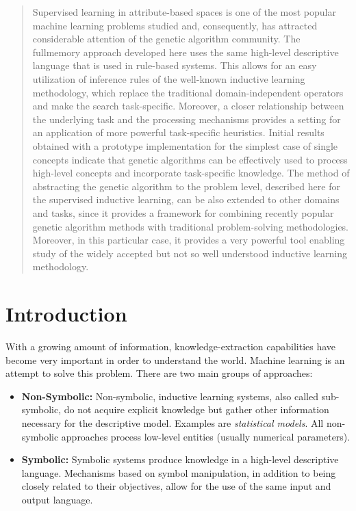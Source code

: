 \documentclass[../main.tex]{subfiles}
\begin{document}
\begin{abstract}
Supervised learning in attribute-based spaces is one of the most popular machine learning problems studied and,
consequently, has attracted considerable attention of the genetic algorithm community. The fullmemory approach
developed here uses the same high-level descriptive language that is used in rule-based systems. This allows for an
easy utilization of inference rules of the well-known inductive learning methodology, which replace the traditional
domain-independent operators and make the search task-specific. Moreover, a closer relationship between the underlying
task and the processing mechanisms provides a setting for an application of more powerful task-specific heuristics.
Initial results obtained with a prototype implementation for the simplest case of single concepts indicate that genetic
algorithms can be effectively used to process high-level concepts and incorporate task-specific knowledge. The method
of abstracting the genetic algorithm to the problem level, described here for the supervised inductive learning, can be
also extended to other domains and tasks, since it provides a framework for combining recently popular genetic
algorithm methods with traditional problem-solving methodologies. Moreover, in this particular case, it provides a very
powerful tool enabling study of the widely accepted but not so well understood inductive learning methodology.
\end{abstract}

\begin{mdframed}
\end{mdframed}

\section{Introduction}

With a growing amount of information, knowledge-extraction capabilities have become very important in order to
understand the world. Machine learning is an attempt to solve this problem. There are two main groups of approaches:

\begin{itemize}
	\item \textbf{Non-Symbolic:} Non-symbolic, inductive learning systems, also called sub-symbolic, do not acquire
	explicit knowledge but gather other information necessary for the descriptive model. Examples are
	\emph{statistical models}. All non-symbolic approaches process low-level entities (usually numerical parameters).
	\item \textbf{Symbolic:}  Symbolic systems produce knowledge in a high-level descriptive language. Mechanisms based
	on symbol manipulation, in addition to being closely related to their objectives, allow for the use of the same
	input and output language.
\end{itemize}
\end{document}
